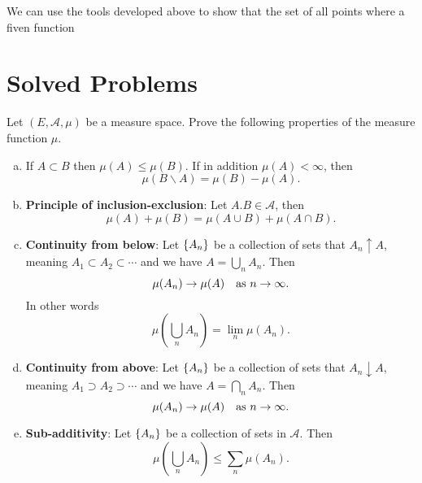 We can use the tools developed above to show that the set of all points where a fiven function 

\section{Solved Problems}

\begin{problem}
	Let $ (E, \mathcal{A}, \mu) $ be a measure space. Prove the following properties of the measure function $ \mu $.
	\begin{enumerate}[(a)]
		\item If $ A\subset B $ then $ \mu(A) \leq \mu(B) $. If in addition $ \mu(A) < \infty $, then
		\[ \mu(B\backslash A) = \mu(B) - \mu(A). \]
		\item \textbf{Principle of inclusion-exclusion}: Let $ A.B \in \mathcal{A} $, then
		\[ \mu(A) + \mu(B) = \mu(A\cup B) + \mu (A\cap B). \]
		\item \textbf{Continuity from below}: Let $ \{A_n\} $ be a collection of sets that $ A_n \uparrow A $, meaning $ A_1\subset A_2 \subset\cdots $ and we have $ A = \bigcup_n A_n $. Then
		\[ \mu(A_n) \to \mu(A) \quad \text{as $ n\to\infty $}. \]
		In other words
		\[ \mu(\bigcup_n A_n) = \lim_n \mu(A_n). \]
		\item \textbf{Continuity from above}: Let $ \{A_n\} $ be a collection of sets that $ A_n \downarrow A $, meaning $ A_1 \supset A_2 \supset \cdots $ and we have $ A = \bigcap_n A_n $. Then
		\[ \mu(A_n) \to \mu(A) \quad \text{as $ n\to\infty $}. \]
		\item \textbf{Sub-additivity}: Let $ \{A_n\} $ be a collection of sets in $ \mathcal{A} $. Then
		\[ \mu(\bigcup_n A_n) \leq \sum_n \mu(A_n). \]
	\end{enumerate}
\end{problem}
